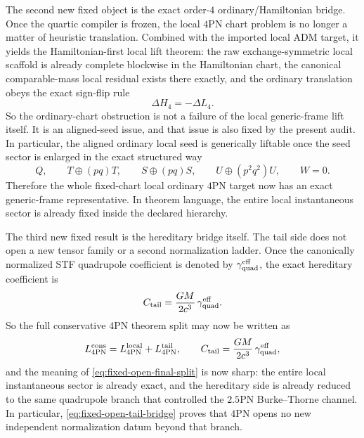 \documentclass[11pt]{article}
\begin{document}
The second new fixed object is the exact order-$4$ ordinary/Hamiltonian bridge.
Once the quartic compiler is frozen, the local $4$PN chart problem is no longer
a matter of heuristic translation.  Combined with the imported local ADM target,
it yields the Hamiltonian-first local lift theorem: the raw exchange-symmetric
local scaffold is already complete blockwise in the Hamiltonian chart, the
canonical comparable-mass local residual exists there exactly, and the ordinary
translation obeys the exact sign-flip rule
\begin{equation}
\Delta H_4=-\Delta L_4.
\label{eq:fixed-open-signflip}
\end{equation}
So the ordinary-chart obstruction is not a failure of the local generic-frame
lift itself.  It is an aligned-seed issue, and that issue is also fixed by the
present audit.  In particular, the aligned ordinary local seed is generically
liftable once the seed sector is enlarged in the exact structured way
\begin{equation}
Q,
\qquad
T\oplus(pq)T,
\qquad
S\oplus(pq)S,
\qquad
U\oplus(p^2q^2)U,
\qquad
W=0.
\label{eq:fixed-open-structured-seed-space}
\end{equation}
Therefore the whole fixed-chart local ordinary $4$PN target now has an exact
generic-frame representative.  In theorem language, the entire local
instantaneous sector is already fixed inside the declared hierarchy.

The third new fixed result is the hereditary bridge itself.  The tail side does
not open a new tensor family or a second normalization ladder.  Once the
canonically normalized STF quadrupole coefficient is denoted by
$\gamma_{\rm quad}^{\rm eff}$, the exact hereditary coefficient is
\begin{equation}
C_{\rm tail}
=
\frac{GM}{2c^3}\,\gamma_{\rm quad}^{\rm eff}.
\label{eq:fixed-open-tail-bridge}
\end{equation}
So the full conservative $4$PN theorem split may now be written as
\begin{equation}
L_{4\mathrm{PN}}^{\mathrm{cons}}
=
L_{4\mathrm{PN}}^{\mathrm{local}}
+
L_{4\mathrm{PN}}^{\mathrm{tail}},
\qquad
C_{\rm tail}
=
\frac{GM}{2c^3}\,\gamma_{\rm quad}^{\rm eff},
\label{eq:fixed-open-final-split}
\end{equation}
and the meaning of \eqref{eq:fixed-open-final-split} is now sharp: the entire
local instantaneous sector is already exact, and the hereditary side is already
reduced to the same quadrupole branch that controlled the $2.5$PN
Burke--Thorne channel.  In particular, \eqref{eq:fixed-open-tail-bridge} proves
that $4$PN opens no new independent normalization datum beyond that branch.
\end{document}
